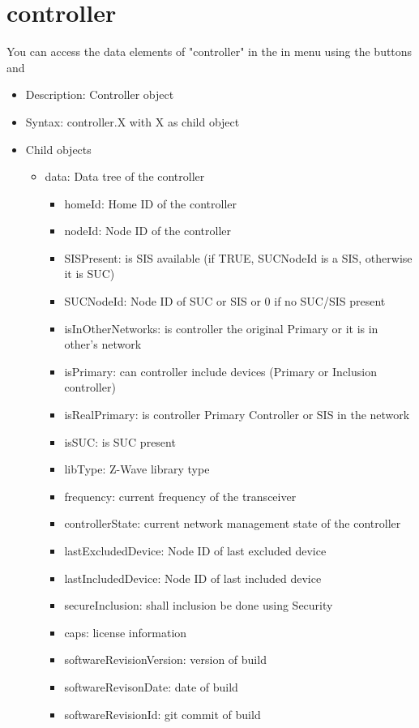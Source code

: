 \section{controller}

You can access the data elements of "controller" in the \zweui in menu 
 using the buttons  
and 

\begin {itemize}
\item Description: Controller object
\item Syntax: controller.X with  X as child object
\item Child objects
\begin {itemize}
\item data: Data tree of the controller
\begin {itemize}
\item  homeId: Home ID of the controller
\item  nodeId: Node ID of the controller
\item  SISPresent: is SIS available (if TRUE, SUCNodeId is a SIS, otherwise it is SUC)
\item  SUCNodeId: Node ID of SUC or SIS or 0 if no SUC/SIS present
\item  isInOtherNetworks: is controller the original Primary or it is in other's network
\item  isPrimary: can controller include devices (Primary or Inclusion controller)
\item  isRealPrimary: is controller Primary Controller or SIS in the network
\item  isSUC: is SUC present
\item  libType: Z-Wave library type
\item  frequency: current frequency of the transceiver

\item  controllerState: current network management state of the controller
\item  lastExcludedDevice: Node ID of last excluded device
\item  lastIncludedDevice: Node ID of last included device
\item  secureInclusion: shall inclusion be done using Security

\item  caps: \zway license information
\item  softwareRevisionVersion: version of \zway build
\item  softwareRevisonDate: date of \zway build
\item  softwareRevisionId: git commit of \zway build


\end{itemize}
\end{itemize}
\end{itemize}

